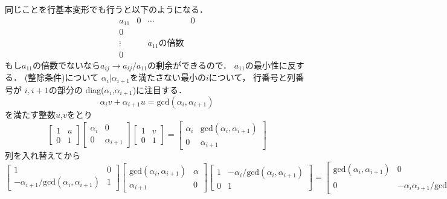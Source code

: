 同じことを行基本変形でも行うと以下のようになる．
\begin{equation}
  \begin{array}{c|ccc}
    a_{11}&0&\cdots&0\\\hline
    0&&&\\
    \vdots&&a_{11}の倍数&\\
    0&&&
  \end{array}
\end{equation}
もし$a_{11}$の倍数でないなら$a_{ij}\to a_{ij}/a_{11}$の剰余ができるので．
$a_{11}$の最小性に反する．
(整除条件)について
$\alpha_{i} | \alpha_{i+1}$を満たさない最小の$i$について，
行番号と列番号が
{$i,i+1$}の部分の
diag($\alpha_i$,$\alpha_{i+1}$)に注目する．
\begin{equation}
    \alpha_i v + \alpha_{i+1} u =\mathrm{gcd}(\alpha_i,\alpha_{i+1})
\end{equation}
を満たす整数$u$,$v$をとり
\begin{equation}
    \begin{bmatrix}
    1 & u\\
    0 & 1
    \end{bmatrix}
    \begin{bmatrix}
    \alpha_i &0\\
    0 & \alpha_{i+1}
    \end{bmatrix}
    \begin{bmatrix}
    1 & v\\
    0 & 1
    \end{bmatrix}
    = 
    \begin{bmatrix}
    \alpha_i & \mathrm{gcd}(\alpha_i,\alpha_{i+1})\\
    0 & \alpha_{i+1}
    \end{bmatrix}
\end{equation}
列を入れ替えてから
\begin{equation}
    \begin{bmatrix}
    1 & 0\\
    -\alpha_{i+1}/\mathrm{gcd}(\alpha_i,\alpha_{i+1}) & 1
    \end{bmatrix}
    \begin{bmatrix}
    \mathrm{gcd}(\alpha_i,\alpha_{i+1}) & \alpha\\
    \alpha_{i+1} & 0
    \end{bmatrix}
    \begin{bmatrix}
    1 & -\alpha_i/\mathrm{gcd}(\alpha_i,\alpha_{i+1}) \\
    0 & 1
    \end{bmatrix}
    =
    \begin{bmatrix}
      \mathrm{gcd}(\alpha_i,\alpha_{i+1})  & 0\\
    0 & -\alpha_i \alpha_{i+1}/  \mathrm{gcd}(\alpha_i,\alpha_{i+1}) 
    \end{bmatrix}
\end{equation}